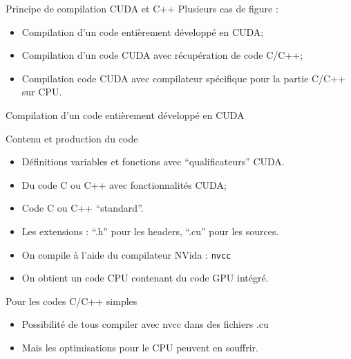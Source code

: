 \documentclass[handout,francais]{beamer}
\begin{document}
\begin{frame}[fragile]{Principe de compilation CUDA et C++}
 Plusieurs cas de figure :

\begin{itemize}
\item Compilation d'un code entièrement développé en CUDA;
\item Compilation d'un code CUDA avec récupération de code C/C++;
\item Compilation code CUDA avec compilateur spécifique pour 
  la partie C/C++ sur CPU.
\end{itemize}

\end{frame}



\begin{frame}{Compilation d'un code entièrement développé en CUDA}

  \begin{exampleblock}{Contenu et production du code}
    \begin{itemize}
    \item Définitions variables et fonctions avec ``qualificateurs''
      CUDA.
    \item Du code C ou C++ avec fonctionnalités CUDA;
    \item Code C ou C++ ``standard''.
    \item Les extensions : ``.h'' pour les headers, ``.cu'' pour les sources.
    \item On compile à l'aide du compilateur NVida : \texttt{nvcc}
    \item On obtient un code CPU contenant du code GPU intégré.
    \end{itemize}
  \end{exampleblock}

  \begin{alertblock}{Pour les codes C/C++ simples}
    \begin{itemize}
    \item Possibilité de tous compiler avec nvcc dans des fichiers .cu
    \item Mais les optimisations pour le CPU peuvent en souffrir.
    \end{itemize}
  \end{alertblock}
\end{frame}
\end{document}
